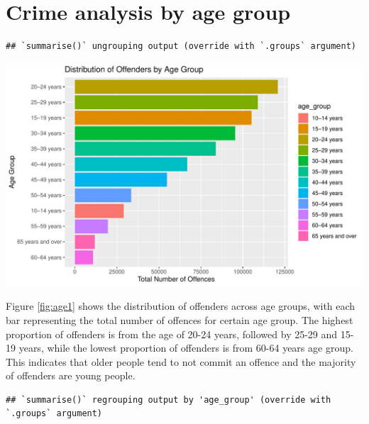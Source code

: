 \documentclass[11pt,a4paper,]{article}
\let\origfigure\figure
\let\endorigfigure\endfigure
\renewenvironment{figure}[1][2] {
\expandafter\origfigure\expandafter[H]
} {
\endorigfigure
}
\begin{document}
\pagebreak

\section*{Crime analysis by age group}

\begin{verbatim}
## `summarise()` ungrouping output (override with `.groups` argument)
\end{verbatim}

\begin{figure}
\centering
\includegraphics{ETC5513-Assignment4_files/figure-latex/age1-1.pdf}
\caption{\label{fig:age1}Total offenders across age groups}
\end{figure}

Figure \ref{fig:age1} shows the distribution of offenders across age groups, with each bar representing the total number of offences for certain age group. The highest proportion of offenders is from the age of 20-24 years, followed by 25-29 and 15-19 years, while the lowest proportion of offenders is from 60-64 years age group. This indicates that older people tend to not commit an offence and the majority of offenders are young people.

\begin{verbatim}
## `summarise()` regrouping output by 'age_group' (override with `.groups` argument)
\end{verbatim}
\end{document}
